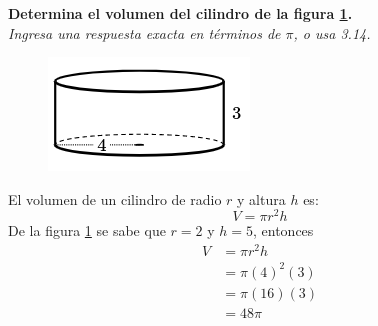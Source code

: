 \question[10] \textbf{Determina el volumen del cilindro de la figura \ref{fig:vol_cil_03}.}\\
\textit{Ingresa una respuesta exacta en términos de $\pi$, o usa 3.14.}

\begin{minipage}{0.3\linewidth}
    \begin{figure}[H]
        \begin{center}
            \includegraphics[width=\textwidth]{../images/vol_cil_03.png}
        \end{center}
        \caption{}
        \label{fig:vol_cil_03}
    \end{figure}
\end{minipage}
\begin{minipage}{0.7\linewidth}
    \begin{solutionbox}{6cm}        El volumen de un cilindro de radio $r$ y altura $h$ es:
        \begin{equation*}
            V = \pi r^2 h
        \end{equation*}
        De la figura \ref{fig:vol_cil_03} se sabe que $r=2$ y $h=5$, entonces
        \begin{equation*}
            \begin{split}
                V & = \pi r^2 h\\
                & = \pi (4)^2 (3)\\
                & = \pi (16) (3)\\
                & = 48\pi
            \end{split}
        \end{equation*}
    \end{solutionbox}
\end{minipage}
